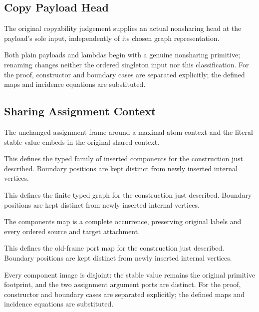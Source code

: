 \subsection{Copy Payload Head}
The original copyability judgement supplies an actual nonsharing head at the payload's sole input, independently of its chosen graph representation.

Both plain payloads and lambdas begin with a genuine nonsharing primitive; renaming changes neither the ordered singleton input nor this classification.
For the proof, constructor and boundary cases are separated explicitly; the defined maps and incidence equations are substituted.
\par{}

\subsection{Sharing Assignment Context}
The unchanged assignment frame around a maximal atom context and the literal stable value embeds in the original shared context.

This defines the typed family of inserted components for the construction just described. Boundary positions are kept distinct from newly inserted internal vertices.
\par{}

This defines the finite typed graph for the construction just described. Boundary positions are kept distinct from newly inserted internal vertices.
\par{}

The components map is a complete occurrence, preserving original labels and every ordered source and target attachment.
\par{}

This defines the old-frame port map for the construction just described. Boundary positions are kept distinct from newly inserted internal vertices.
\par{}

Every component image is disjoint: the stable value remains the original primitive footprint, and the two assignment argument ports are distinct.
For the proof, constructor and boundary cases are separated explicitly; the defined maps and incidence equations are substituted.
\par{}

